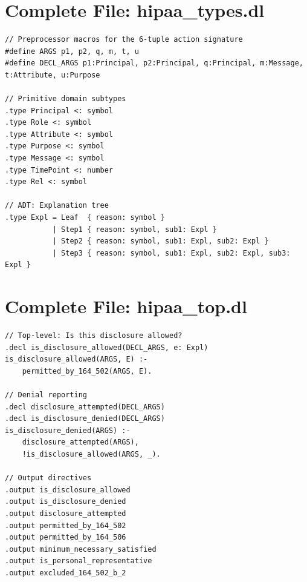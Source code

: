 \documentclass[11pt,letterpaper]{article}
\begin{document}
\begin{appendices}

\section{Complete File: hipaa\_types.dl}
\label{app:types}

\begin{lstlisting}[style=soufflestyle]
// Preprocessor macros for the 6-tuple action signature
#define ARGS p1, p2, q, m, t, u
#define DECL_ARGS p1:Principal, p2:Principal, q:Principal, m:Message, t:Attribute, u:Purpose

// Primitive domain subtypes
.type Principal <: symbol
.type Role <: symbol
.type Attribute <: symbol
.type Purpose <: symbol
.type Message <: symbol
.type TimePoint <: number
.type Rel <: symbol

// ADT: Explanation tree
.type Expl = Leaf  { reason: symbol }
           | Step1 { reason: symbol, sub1: Expl }
           | Step2 { reason: symbol, sub1: Expl, sub2: Expl }
           | Step3 { reason: symbol, sub1: Expl, sub2: Expl, sub3: Expl }
\end{lstlisting}

\section{Complete File: hipaa\_top.dl}
\label{app:top}

\begin{lstlisting}[style=soufflestyle]
// Top-level: Is this disclosure allowed?
.decl is_disclosure_allowed(DECL_ARGS, e: Expl)
is_disclosure_allowed(ARGS, E) :-
    permitted_by_164_502(ARGS, E).

// Denial reporting
.decl disclosure_attempted(DECL_ARGS)
.decl is_disclosure_denied(DECL_ARGS)
is_disclosure_denied(ARGS) :-
    disclosure_attempted(ARGS),
    !is_disclosure_allowed(ARGS, _).

// Output directives
.output is_disclosure_allowed
.output is_disclosure_denied
.output disclosure_attempted
.output permitted_by_164_502
.output permitted_by_164_506
.output minimum_necessary_satisfied
.output is_personal_representative
.output excluded_164_502_b_2
\end{lstlisting}




\end{appendices}
\end{document}
